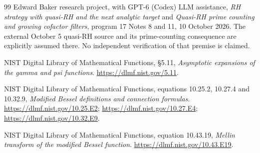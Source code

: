 \documentclass[11pt]{article}
\theoremstyle{definition}
\theoremstyle{remark}
\begin{document}
\begin{thebibliography}{99}
Edward Baker research project, with GPT-6 (Codex) LLM assistance,
\emph{RH strategy with quasi-RH and the next analytic target} and
\emph{Quasi-RH prime counting and growing cofactor filters},
program 17 Notes 8 and 11, 10 October 2026. The external October 5
quasi-RH source and its prime-counting consequence are explicitly
assumed there. No independent verification of that premise is claimed.

NIST Digital Library of Mathematical Functions, \S5.11,
\emph{Asymptotic expansions of the gamma and psi functions}.
\url{https://dlmf.nist.gov/5.11}.

NIST Digital Library of Mathematical Functions, equations 10.25.2, 10.27.4
and 10.32.9, \emph{Modified Bessel definitions and connection formulas}.
\url{https://dlmf.nist.gov/10.25.E2};
\url{https://dlmf.nist.gov/10.27.E4};
\url{https://dlmf.nist.gov/10.32.E9}.

NIST Digital Library of Mathematical Functions, equation 10.43.19,
\emph{Mellin transform of the modified Bessel function}.
\url{https://dlmf.nist.gov/10.43.E19}.

\end{thebibliography}
\end{document}
